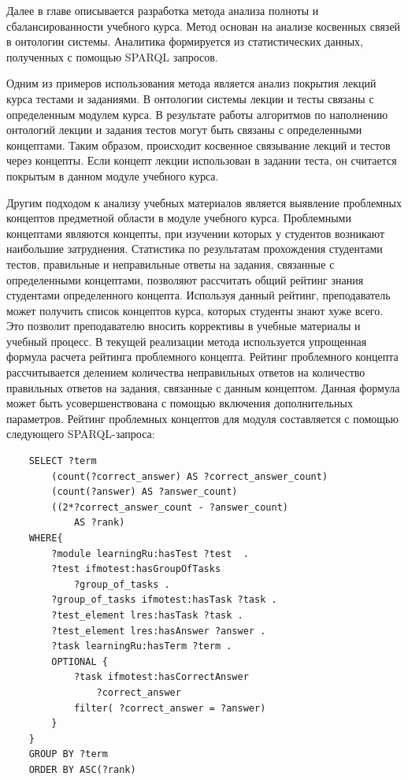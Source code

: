 Далее в главе описывается разработка метода анализа полноты и сбалансированности  учебного курса. Метод основан на анализе косвенных связей в онтологии системы. Аналитика формируется из статистических данных, полученных с помощью SPARQL запросов. 

Одним из примеров использования метода является анализ покрытия лекций курса тестами и заданиями. В онтологии системы лекции и тесты связаны с определенным модулем курса. В результате работы алгоритмов по наполнению онтологий лекции и задания тестов могут быть связаны с определенными концептами. Таким образом, происходит косвенное связывание лекций и тестов через концепты. Если концепт лекции использован в задании теста, он считается покрытым в данном модуле учебного курса.

Другим подходом к анализу учебных материалов является выявление проблемных концептов предметной области в модуле учебного курса. Проблемными концептами являются концепты, при изучении которых у студентов возникают наибольшие затруднения. Статистика по результатам прохождения студентами тестов, правильные и неправильные ответы на задания, связанные с определенными концептами, позволяют рассчитать общий рейтинг знания студентами определенного концепта. Используя данный рейтинг, преподаватель может получить список концептов курса, которых студенты знают хуже всего. Это позволит преподавателю вносить коррективы в учебные материалы и учебный процесс. В текущей реализации метода используется упрощенная формула расчета рейтинга проблемного концепта. Рейтинг проблемного концепта рассчитывается делением количества неправильных ответов на количество правильных ответов на задания, связанные с данным концептом. Данная формула может быть усовершенствована с помощью включения дополнительных параметров. Рейтинг проблемных концептов для модуля составляется с помощью следующего  SPARQL-запроса:

\begin{verbatim}
    SELECT ?term 
        (count(?correct_answer) AS ?correct_answer_count)
        (count(?answer) AS ?answer_count)
        ((2*?correct_answer_count - ?answer_count) 
            AS ?rank) 
    WHERE{
        ?module learningRu:hasTest ?test  . 
        ?test ifmotest:hasGroupOfTasks 
            ?group_of_tasks .        
        ?group_of_tasks ifmotest:hasTask ?task .      
        ?test_element lres:hasTask ?task .
        ?test_element lres:hasAnswer ?answer .
        ?task learningRu:hasTerm ?term .       
        OPTIONAL { 
            ?task ifmotest:hasCorrectAnswer 
                ?correct_answer
            filter( ?correct_answer = ?answer)
        }         
    }
    GROUP BY ?term 
    ORDER BY ASC(?rank)
\end{verbatim}


